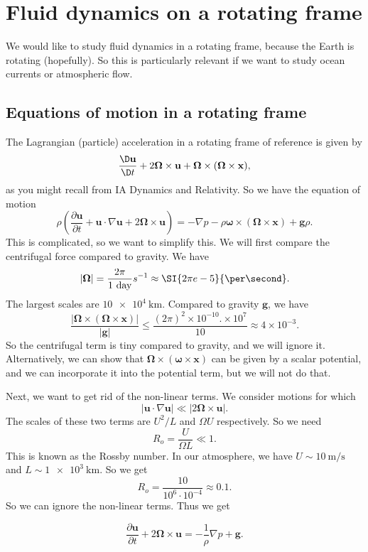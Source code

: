 \documentclass[a4paper]{article}
\begin{document}
\section{Fluid dynamics on a rotating frame}
We would like to study fluid dynamics in a rotating frame, because the Earth is rotating (hopefully). So this is particularly relevant if we want to study ocean currents or atmospheric flow.

\subsection{Equations of motion in a rotating frame}

The Lagrangian (particle) acceleration in a rotating frame of reference is given by
\[
  \frac{\D \mathbf{u}}{\D t} + 2 \boldsymbol\Omega \times \mathbf{u} + \boldsymbol\Omega \times (\boldsymbol\Omega \times \mathbf{x}),
\]
as you might recall from IA Dynamics and Relativity. So we have the equation of motion
\[
  \rho\left(\frac{\partial \mathbf{u}}{\partial t} + \mathbf{u}\cdot \nabla \mathbf{u} + 2 \boldsymbol\Omega \times \mathbf{u}\right) = -\nabla p - \rho \boldsymbol\omega \times (\boldsymbol\Omega \times \mathbf{x}) + \mathbf{g} \rho.
\]
This is complicated, so we want to simplify this. We will first compare the centrifugal force compared to gravity. We have
\[
  |\boldsymbol\Omega| = \frac{2\pi}{1\text{ day}} s^{-1} \approx \SI{2\pi e-5}{\per\second}.
\]
The largest scales are $\SI{10e4}{\kilo\meter}$. Compared to gravity $\mathbf{g}$, we have
\[
  \frac{|\boldsymbol\Omega \times (\boldsymbol\Omega \times \mathbf{x})|}{|\mathbf{g}|}\leq \frac{(2\pi)^2 \times 10^{-10}.\times 10^7}{10} \approx 4 \times 10^{-3}.
\]
So the centrifugal term is tiny compared to gravity, and we will ignore it. Alternatively, we can show that $\boldsymbol\Omega \times (\boldsymbol\omega \times \mathbf{x})$ can be given by a scalar potential, and we can incorporate it into the potential term, but we will not do that.

Next, we want to get rid of the non-linear terms. We consider motions for which
\[
  |\mathbf{u}\cdot \nabla \mathbf{u}| \ll |2 \boldsymbol\Omega \times \mathbf{u}|.
\]
The scales of these two terms are $U^2/L$ and $\Omega U$ respectively. So we need
\[
  R_o = \frac{U}{\Omega L} \ll 1.
\]
This is known as the Rossby number. In our atmosphere, we have $U \sim \SI{10}{\meter\per\second}$ and $L \sim \SI{1e3}{\kilo\meter}$. So we get
\[
  R_o = \frac{10}{10^6 \cdot 10^{-4}} \approx 0.1.
\]
So we can ignore the non-linear terms. Thus we get
\begin{prop}
  \[
    \frac{\partial \mathbf{u}}{\partial t} + 2 \boldsymbol\Omega \times \mathbf{u} = -\frac{1}{\rho} \nabla p + \mathbf{g}.
  \]
\end{prop}
\end{document}
